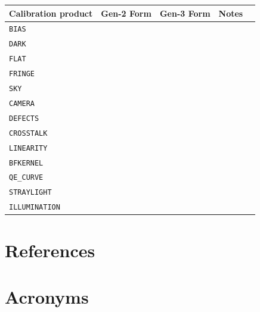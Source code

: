 \documentclass[DM,authoryear,toc]{lsstdoc}
\begin{document}
\begin{tabular}{l |c|c|l|l}
  Calibration product & Gen-2 Form & Gen-3 Form & Notes \\
  \hline
  \verb|BIAS| & & & \\
  \verb|DARK| & & & \\
  \verb|FLAT| & & & \\
  \verb|FRINGE| & & & \\
  \verb|SKY| & & & \\
  \verb|CAMERA| & & & \\
  \verb|DEFECTS| & & & \\
  \verb|CROSSTALK| & & & \\
  \verb|LINEARITY| & & & \\
  \verb|BFKERNEL| & & & \\
  \verb|QE_CURVE| & & & \\
  \verb|STRAYLIGHT| & & & \\
  \verb|ILLUMINATION| & & & \\
\end{tabular}

\section{References} \label{sec:bib}


\section{Acronyms} \label{sec:acronyms}

\end{document}
